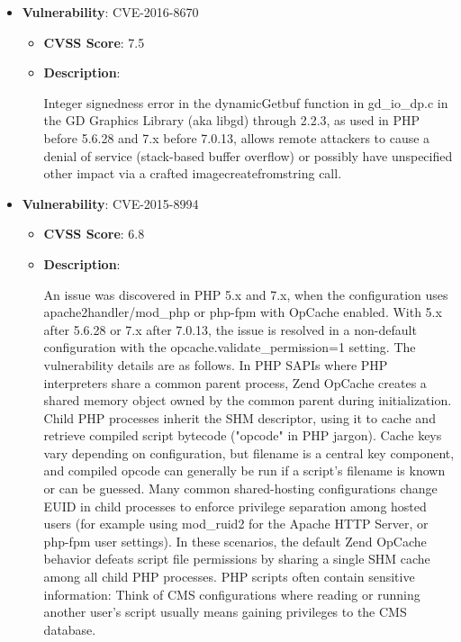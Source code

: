 \documentclass{article}
\begin{document}
\begin{itemize}
        \item \textbf{Vulnerability}: CVE-2016-8670
        \begin{itemize}
            \item \textbf{CVSS Score}:  7.5 
            \item \textbf{Description}:
            \parbox[t]{0.9\linewidth}{
                \ttfamily Integer signedness error in the dynamicGetbuf function in gd\_io\_dp.c in the GD Graphics Library (aka libgd) through 2.2.3, as used in PHP before 5.6.28 and 7.x before 7.0.13, allows remote attackers to cause a denial of service (stack-based buffer overflow) or possibly have unspecified other impact via a crafted imagecreatefromstring call.
            }
        \end{itemize}
    
        \item \textbf{Vulnerability}: CVE-2015-8994
        \begin{itemize}
            \item \textbf{CVSS Score}:  6.8 
            \item \textbf{Description}:
            \parbox[t]{0.9\linewidth}{
                \ttfamily An issue was discovered in PHP 5.x and 7.x, when the configuration uses apache2handler/mod\_php or php-fpm with OpCache enabled. With 5.x after 5.6.28 or 7.x after 7.0.13, the issue is resolved in a non-default configuration with the opcache.validate\_permission=1 setting. The vulnerability details are as follows. In PHP SAPIs where PHP interpreters share a common parent process, Zend OpCache creates a shared memory object owned by the common parent during initialization. Child PHP processes inherit the SHM descriptor, using it to cache and retrieve compiled script bytecode ("opcode" in PHP jargon). Cache keys vary depending on configuration, but filename is a central key component, and compiled opcode can generally be run if a script's filename is known or can be guessed. Many common shared-hosting configurations change EUID in child processes to enforce privilege separation among hosted users (for example using mod\_ruid2 for the Apache HTTP Server, or php-fpm user settings). In these scenarios, the default Zend OpCache behavior defeats script file permissions by sharing a single SHM cache among all child PHP processes. PHP scripts often contain sensitive information: Think of CMS configurations where reading or running another user's script usually means gaining privileges to the CMS database.
            }
        \end{itemize}
    

\end{itemize}
\end{document}
